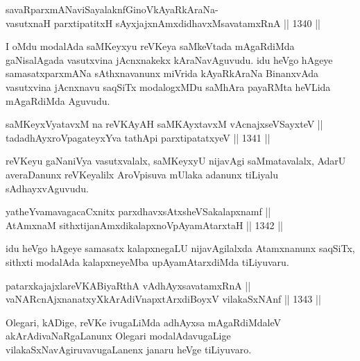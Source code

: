 \begin{shl}
savaRparxmANaviSayalaknfGinoV\s kAyaRkAraNa-\\
vasutxnaH parxtipatitxH sAyxjajxnAmxdidhavxMsavatamxRnA \hfill || 1340 ||  
\end{shl}

\begin{artha}
I oMdu modalAda saMKeyxyu reVKeya saMkeVtada mAgaRdiMda gaNisalAgada vasutxvina jAcnxnakekx kAraNavAguvudu. idu heVgo hAgeye samasatxparxmANa sAthxnavanunx miVrida kAyaRkAraNa BinanxvAda vasutxvina jAcnxnavu saqSiTx modalogxMDu saMhAra payaRMta heVLida mAgaRdiMda Aguvudu.
\end{artha}


\begin{shl}
saMKeyxVyatavxM na reVKAyAH saMKAyxtavxM vA\s cnajxseVSayxteV  || \\
tadadhAyxroVpagateyxYva tathA\s pi parxtipatatxyeV \hfill || 1341 ||  
\end{shl}

\begin{artha}
reVKeyu gaNaniVya vasutxvalalx, saMKeyxyU nijavAgi saMmatavalalx, AdarU averaDanunx reVKeyalilx AroVpisuva mUlaka adanunx tiLiyalu sAdhayxvAguvudu.
\end{artha}

\begin{shl}
yatheYvamavagacaCxnitx parxdhavxsAtxsheVSakalapxnamf || \\
AtAmxnaM sithxtijanAmxdikalapxnoVpAyamAtarxtaH \hfill || 1342 ||  
\end{shl}

\begin{artha}
idu heVgo hAgeye samasatx kalapxnegaLU nijavAgilalxda Atamxnanunx saqSiTx, sithxti modalAda kalapxneyeMba upAyamAtarxdiMda tiLiyuvaru.
\end{artha}


\begin{shl}
patarxkajajxlareVKABiyaRthA vA\s dhAyxsavatamxRnA || \\
vaNARcnAjxnanatxyXkArAdiVnapxtArxdiBoyxV vilakaSxNAnf  \hfill || 1343 ||  
\end{shl}

\begin{artha}
Olegari, kADige, reVKe ivugaLiMda adhAyxsa mAgaRdiMdaleV akArAdivaNaRgaLanunx Olegari modalAdavugaLige vilakaSxNavAgiruvavugaLanenx janaru heVge tiLiyuvaro.
\end{artha}

